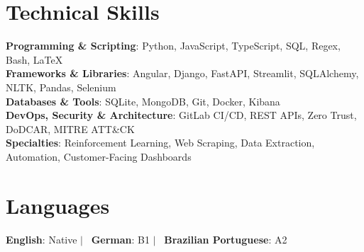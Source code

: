 \documentclass[letterpaper,11pt]{article}
\begin{document}
\section{Technical Skills}
\begin{itemize}[leftmargin=0.15in, label={}]
\small{\item{
\textbf{Programming \& Scripting}{: Python, JavaScript, TypeScript, SQL, Regex, Bash, LaTeX} \\
\textbf{Frameworks \& Libraries}{: Angular, Django, FastAPI, Streamlit, SQLAlchemy, NLTK, Pandas, Selenium} \\
\textbf{Databases \& Tools}{: SQLite, MongoDB, Git, Docker, Kibana} \\
\textbf{DevOps, Security \& Architecture}{: GitLab CI/CD, REST APIs, Zero Trust, DoDCAR, MITRE ATT\&CK} \\
\textbf{Specialties}{: Reinforcement Learning, Web Scraping, Data Extraction, Automation, Customer-Facing Dashboards}
}}
\end{itemize}

\section*{Languages}
\begin{itemize}[leftmargin=0.15in, label={}]
\small{\item{
\textbf{English}{: Native} $|$ \
\textbf{German}{: B1} $|$ \
\textbf{Brazilian Portuguese}{: A2}
}}
\end{itemize}

\end{document}
